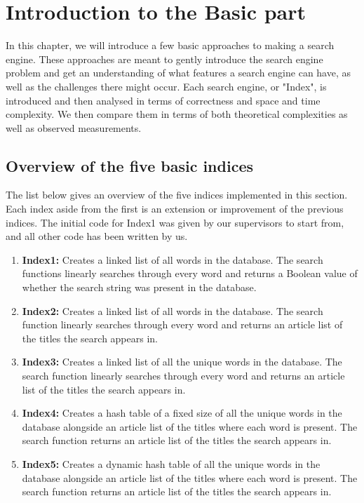 \section{Introduction to the Basic part}

In this chapter, we will introduce a few basic approaches to making a search engine. These approaches are meant to gently introduce the search engine problem and get an understanding of what features a search engine can have, as well as the challenges there might occur. Each search engine, or "Index", is introduced and then analysed in terms of correctness and space and time complexity. We then compare them in terms of both theoretical complexities as well as observed measurements. 

\subsection{Overview of the five basic indices}

The list below gives an overview of the five indices implemented in this section. Each index aside from the first is an extension or improvement of the previous indices. The initial code for Index1 was given by our supervisors to start from, and all other code has been written by us. 

\begin{enumerate}
    \item[] \textbf{Index1:} Creates a linked list of all words in the database. The search functions linearly searches through every word and returns a Boolean value of whether the search string was present in the database.
    \item[] \textbf{Index2:} Creates a linked list of all words in the database. The search function linearly searches through every word and returns an article list of the titles the search appears in. 
    \item[] \textbf{Index3:} Creates a linked list of all the unique words in the database. The search function linearly searches through every word and returns an article list of the titles the search appears in.
    \item[] \textbf{Index4:} Creates a hash table of a fixed size of all the unique words in the database alongside an article list of the titles where each word is present. The search function returns an article list of the titles the search appears in.
    \item[] \textbf{Index5:} Creates a dynamic hash table of all the unique words in the database alongside an article list of the titles where each word is present. The search function returns an article list of the titles the search appears in.
\end{enumerate}




